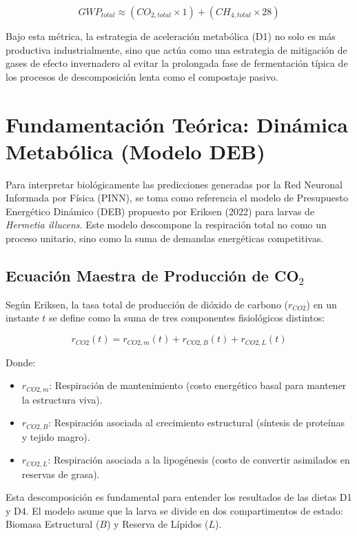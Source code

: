 \begin{equation}
    GWP_{total} \approx (CO_{2, total} \times 1) + (CH_{4, total} \times 28)
\end{equation}

Bajo esta métrica, la estrategia de aceleración metabólica (D1) no solo es más productiva industrialmente, sino que actúa como una estrategia de mitigación de gases de efecto invernadero al evitar la prolongada fase de fermentación típica de los procesos de descomposición lenta como el compostaje pasivo.

\section{Fundamentación Teórica: Dinámica Metabólica (Modelo DEB)}

Para interpretar biológicamente las predicciones generadas por la Red Neuronal Informada por Física (PINN), se toma como referencia el modelo de Presupuesto Energético Dinámico (DEB) propuesto por Eriksen (2022) para larvas de \textit{Hermetia illucens}. Este modelo descompone la respiración total no como un proceso unitario, sino como la suma de demandas energéticas competitivas.

\subsection{Ecuación Maestra de Producción de CO$_2$}

Según Eriksen, la tasa total de producción de dióxido de carbono ($r_{CO2}$) en un instante $t$ se define como la suma de tres componentes fisiológicos distintos:

\begin{equation} \label{eq:eriksen_master}
    r_{CO2}(t) = r_{CO2,m}(t) + r_{CO2,B}(t) + r_{CO2,L}(t)
\end{equation}

Donde:
\begin{itemize}
    \item $r_{CO2,m}$: Respiración de mantenimiento (costo energético basal para mantener la estructura viva).
    \item $r_{CO2,B}$: Respiración asociada al crecimiento estructural (síntesis de proteínas y tejido magro).
    \item $r_{CO2,L}$: Respiración asociada a la lipogénesis (costo de convertir asimilados en reservas de grasa).
\end{itemize}

Esta descomposición es fundamental para entender los resultados de las dietas D1 y D4. El modelo asume que la larva se divide en dos compartimentos de estado: Biomasa Estructural ($B$) y Reserva de Lípidos ($L$).


